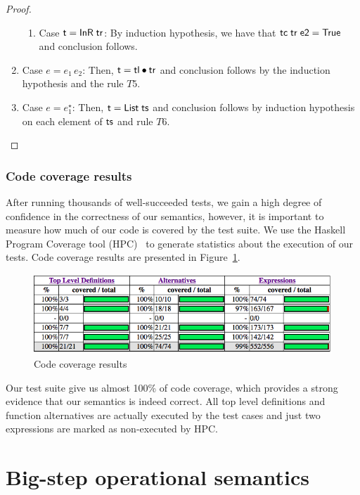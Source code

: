 \documentclass[oneside,12pt]{scrbook}
\theoremstyle{definition}
\newcommand{\C}[1]{\red{\mathsf{#1}}}
\newcommand{\F}[1]{\green{\mathsf{#1}}}
\newcommand{\V}[1]{\black{\mathsf{#1}}}
\theoremstyle{plain}
\theoremstyle{definition}
\begin{document}
\begin{proof}
\begin{enumerate}
\begin{enumerate}
			\item Case \ensuremath{\V{t}\mathrel{=}\C{InR}\;\V{tr}}: By induction hypothesis, we have that \ensuremath{\F{tc}\;\V{tr}\;\V{e2}\mathrel{=}\C{True}} and conclusion follows.
		\end{enumerate}
		\item Case $e = e_1\,e_2$: Then, \ensuremath{\V{t}\mathrel{=}\V{tl}\C{\:\bullet\:}\V{tr}} and conclusion follows by the induction
		hypothesis and the rule $T5$.
		\item Case $e = e_1^\star$: Then, \ensuremath{\V{t}\mathrel{=}\C{List}\;\V{ts}} and conclusion follows by induction hypothesis
		on each element of \ensuremath{\V{ts}} and rule $T6$.
	\end{enumerate}
\end{proof}

\subsection{Code coverage results}

After running thousands of well-succeeded tests, we gain a high degree of confidence in the correctness
of our semantics, however, it is important to measure how much of our code is covered by the test suite.
We use the Haskell Program Coverage tool (HPC)~\cite{Gill2007} to generate statistics about the execution of our tests.
Code coverage results are presented in Figure~\ref{figure:coverage}.

\begin{figure}[h!]
	\includegraphics[width=\linewidth]{coverage-results.png}
	\caption{Code coverage results}
	\label{figure:coverage}
\end{figure}

Our test suite give us almost 100\% of code coverage, which provides a strong evidence that our semantics
is indeed correct. All top level definitions and function alternatives are actually executed by the test cases
and just two expressions are marked as non-executed by HPC.

\chapter{Big-step operational semantics}\label{chapter:bigstepsemantics}
\end{document}
